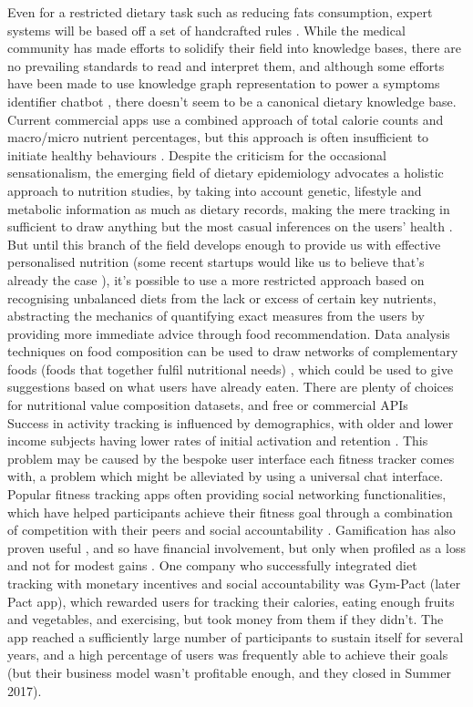 Even for a restricted dietary task such as reducing fats consumption, expert systems will be based off a set of handcrafted rules \cite{Prochaska2005}. While the medical community has made efforts to solidify their field into knowledge bases, there are no prevailing standards to read and interpret them, and although some efforts have been made to use knowledge graph representation to power a symptoms identifier chatbot \cite{minutoloa2017conversational}, there doesn't seem to be a canonical dietary knowledge base. Current commercial apps use a combined approach of total calorie counts and macro/micro nutrient percentages, but this approach is often insufficient to initiate healthy behaviours \cite{Davis2016}.
Despite the criticism for the occasional sensationalism, the emerging field of dietary epidemiology advocates a holistic approach to nutrition studies, by taking into account genetic, lifestyle and metabolic information as much as dietary records, making the mere tracking in sufficient to draw anything but the most casual inferences on the users' health \cite{byers2001food}. But until this branch of the field develops enough to provide us with effective personalised nutrition (some recent startups would like us to believe that's already the case \cite{habitwebsite}), it's possible to use a more restricted approach based on recognising unbalanced diets from the lack or excess of certain key nutrients, abstracting the mechanics of quantifying exact measures from the users by providing more immediate advice through food recommendation. Data analysis techniques on food composition can be used to draw networks of complementary foods (foods that together fulfil nutritional needs) \cite{Kim2015a}, which could be used to give suggestions based on what users have already eaten. There are plenty of choices for nutritional value composition datasets\cite{}, and free or commercial APIs \cite{}\\
Success in activity tracking is influenced by demographics, with older and lower income subjects having lower rates of initial activation and retention \cite{Patel2017}. This problem may be caused by the bespoke user interface each fitness tracker comes with, a problem which might be alleviated by using a universal chat interface.\\
Popular fitness tracking apps often providing social networking functionalities, which have helped participants achieve their fitness goal through a combination of competition with their peers and social accountability \cite{chenchen2014}. Gamification has also proven useful \cite{doi:10.1001/jamainternmed.2017.3458}, and so have financial involvement, but only when profiled as a loss and not for modest gains \cite{doi:10.7326/M15-1635}. One company who successfully integrated diet tracking with monetary incentives and social accountability was Gym-Pact (later Pact app), which rewarded users for tracking their calories, eating enough fruits and vegetables, and exercising, but took money from them if they didn't. The app reached a sufficiently large number of participants \cite{nudgingpracticioner} to sustain itself for several years, and a high percentage of users was frequently able to achieve their goals (but their business model wasn't profitable enough, and they closed in Summer 2017).
